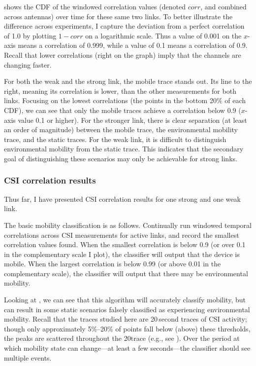  shows the CDF of the windowed correlation values (denoted $\mathit{corr}$, and combined across antennas) over time for these same two links. To better illustrate the difference across experiments, I capture the deviation from a perfect correlation of 1.0 by plotting $1-\mathit{corr}$ on a logarithmic scale. Thus a value of 0.001 on the $x$-axis means a correlation of 0.999, while a value of 0.1 means a correlation of 0.9. Recall that lower correlations (right on the graph) imply that the channels are changing faster.

For both the weak and the strong link, the mobile trace stands out. Its line to the right, meaning its correlation is lower, than the other measurements for both links. Focusing on the lowest correlations (the points in the bottom 20\% of each CDF), we can see that only the mobile traces achieve a correlation below 0.9 ($x$-axis value 0.1 or higher). For the stronger link, there is clear separation (at least an order of magnitude) between the mobile trace, the environmental mobility trace, and the static traces. For the weak link, it is difficult to distinguish environmental mobility from the static trace. This indicates that the secondary goal of distinguishing these scenarios may only be achievable for strong links.

\subsubsection{CSI correlation results}
Thus far, I have presented CSI correlation results for one strong and one weak link.

The basic mobility classification is as follows. Continually run windowed temporal correlations across CSI measurements for active links, and record the smallest correlation values found. When the smallest correlation is below 0.9 (or over 0.1 in the complementary scale I plot), the classifier will output that the device is mobile. When the largest correlation is below 0.99 (or above 0.01 in the complementary scale), the classifier will output that there may be environmental mobility.

Looking at , we can see that this algorithm will accurately classify mobility, but can result in some static scenarios falsely classified as experiencing environmental mobility. Recall that the traces studied here are 20\,second traces of CSI activity; though only approximately 5\%--20\% of points fall below (above) these thresholds, the peaks are scattered throughout the 20\s trace (e.g., see ). Over the period at which mobility state can change---at least a few seconds---the classifier should see multiple events.

